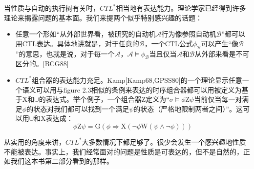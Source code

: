 \documentclass{book}
\begin{document}
    当性质与自动的执行树有关时，$CTL^*$相当地有表达能力。理论学家已经得到许多理论来揭露问题的基本面。我们来提两个似乎特别感兴趣的话题：
    \begin{itemize}
      \item 任意一个形如“从外部世界看，被研究的自动机$\mathcal{A}$行为像参照自动机$\mathcal{B}$”都可以用CTL表达。具体地讲就是，对于任意的$\mathcal{B}$，一个CTL公式$\phi_{\mathcal{B}}$可以产生“像$\mathcal{B}$”的意思，也就是说，对于每一个$\mathcal{A}$，$\mathcal{A} \models \phi_{\mathcal{B}}$当且仅当$\mathcal{A}$和$\mathcal{B}$从外部来看是不可区分的。[BCG88]
      \item $CTL^*$组合器的表达能力充足。Kamp[Kamp68,GPSS80]的一个理论显示任意一个语义可以用与figure 2.3相似的条例来表达的时序组合器都可以用被定义为基于$\mathrm{X}$和$\cup$的表达式。举个例子，一个组合器$\mathrm{Z}$定义为“$\sigma \models \phi \mathrm{Z} \psi$当前仅当每一对满足$\phi$的状态对我们都可以找到一个满足$\psi$的状态（严格地限制两者之间）”。这可以用$\cup$和$\mathrm{X}$表达成：
          \begin{equation*}
            \phi\mathrm{Z}\psi=\mathrm{G}(\phi \Rightarrow \mathrm{X}(\neg\phi\mathrm{W}(\psi\wedge\neg\phi)))
          \end{equation*}
    \end{itemize}
    
    从实用的角度来讲，$CTL^*$大多数情况下都足够了。很少会发生一个感兴趣地性质不能被表达。事实上，我们经常面对的问题是性质是可表达的，但不是自然的，正如我们这本书第二部分看到的那样。
\end{document}
